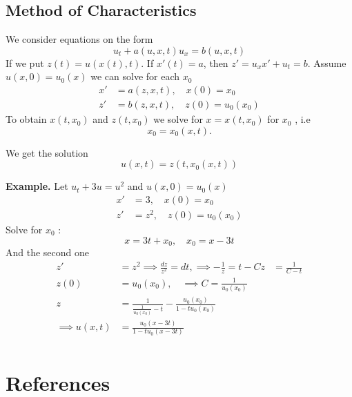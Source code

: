 \documentclass{article}
\theoremstyle{remark}
\begin{document}
\subsection{Method of Characteristics}%
\label{sub:method_of_characteristics}

We consider equations on the form \[
u_{t} + a\left( u,x,t \right) u_{x} = b\left( u,x,t \right)
\] 
If we put $z\left( t \right) = u\left( x\left( t \right), t \right)$. If $x' \left( t \right) =a$, then $z'  = u_{x} x'  + u_{t} = b$. Assume $u\left( x,0 \right) = u_{0} \left( x \right) $ we can solve for each $x_{0}$ \[
\begin{split}
  x'   & = a\left( z,x,t \right),\quad x\left( 0 \right) = x_{0} \\
  z'  &=  b\left( z,x,t \right), \quad z\left( 0 \right) = u_{0}\left( x_{0} \right)  
\end{split} 
\] 
To obtain $x\left( t,x_{0} \right)$ and $z\left( t, x_{0} \right)$ we solve for $x = x\left( t, x_{0} \right)$ for $x_{0}$ , i.e \[
x_{0} = x_{0} \left( x,t \right).
\] 

We get the solution \[
u\left( x,t \right) = z \left( t,x_{0}\left( x,t \right) \right)
\] 

\begin{tcolorbox}
  \textbf{Example.} Let $u_{t} + 3u = u^2$  and $u\left( x,0 \right) = u_{0} \left( x \right)$ \[
  \begin{split}
    x'  &=  3, \quad x\left( 0 \right) = x_{0}  \\
    z'  &=  z^2, \quad z\left( 0 \right) = u_{0}\left( x_{0} \right)  
  \end{split} 
  \]  
  Solve for $x_{0} $ : \[
  x = 3t + x_{0} , \quad  x_{0} = x-3t 
  \] 
  And the second one \[
    \begin{split}
  z'   & = z^2 \implies \frac{dz}{z^2}  = dt , \implies  -\frac{1}{z} = t - C
  z &=  \frac{1}{C - t} \\
  z\left( 0 \right)  & = u_{0} \left( x_{0} \right) , \quad  \implies  C = \frac{1}{u_{0}\left( x_{0} \right)}  \\
  z&= \frac{1}{\frac{1}{u_{0}\left( x_{0} \right)} - t} - \frac{u_{0}\left( x_{0} \right)}{1 - t u_{0}\left( x_{0} \right)}  \\
  \implies  u\left( x,t \right) &=  \frac{u_{0} \left( x-3t \right)}{1 - t u_{0}\left( x -3t \right)}  \\
    \end{split} 
  \] 
\end{tcolorbox}






\section{References}%
\label{sec:references}


  


\end{document}
